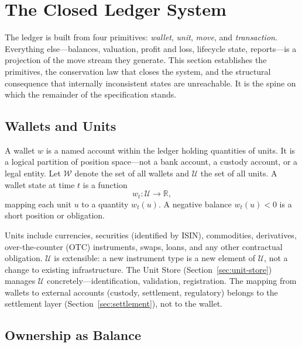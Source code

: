 \section{The Closed Ledger System}
\label{sec:sec02}
\label{sec:ledger}%

The ledger is built from four primitives: \emph{wallet}, \emph{unit}, \emph{move}, and \emph{transaction}. Everything else---balances, valuation, profit and loss, lifecycle state, reports---is a projection of the move stream they generate. This section establishes the primitives, the conservation law that closes the system, and the structural consequence that internally inconsistent states are unreachable. It is the spine on which the remainder of the specification stands.

\subsection{Wallets and Units}

\begin{definition}[Wallet]
A wallet $w$ is a named account within the ledger holding quantities of units. It is a logical partition of position space---not a bank account, a custody account, or a legal entity. Let $\mathcal{W}$ denote the set of all wallets and $\mathcal{U}$ the set of all units. A wallet state at time $t$ is a function
\[
w_t : \mathcal{U} \to \mathbb{R},
\]
mapping each unit $u$ to a quantity $w_t(u)$. A negative balance $w_t(u) < 0$ is a short position or obligation.
\end{definition}

Units include currencies, securities (identified by ISIN), commodities, derivatives, over-the-counter (OTC) instruments, swaps, loans, and any other contractual obligation. $\mathcal{U}$ is extensible: a new instrument type is a new element of $\mathcal{U}$, not a change to existing infrastructure. The Unit Store (Section~\ref{sec:unit-store}) manages $\mathcal{U}$ concretely---identification, validation, registration. The mapping from wallets to external accounts (custody, settlement, regulatory) belongs to the settlement layer (Section~\ref{sec:settlement}), not to the wallet.

\subsection{Ownership as Balance}

